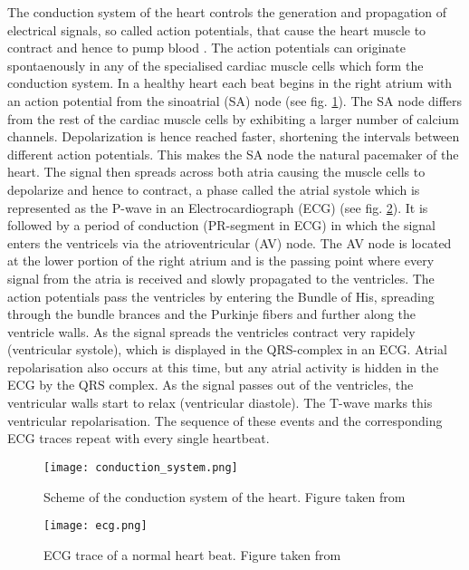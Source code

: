 \documentclass[type=dr, dr=rernat, accentcolor=tud7b,colorbacktitle, bigchapter, openright, twoside, 12pt ]{tudthesis}
\begin{document}
The conduction system of the heart controls the generation and propagation of electrical signals, so called action potentials, that cause 
the heart muscle to contract and hence to pump blood \cite{Med}. The action potentials can originate spontaenously in any of the specialised 
cardiac muscle cells which form the conduction system. In a healthy heart each beat begins in the right atrium with an action potential 
from the sinoatrial (SA) node (see fig. \ref{condsys}). The SA node differs from the rest of the cardiac muscle cells by exhibiting a larger 
number of calcium channels. Depolarization is hence reached faster, shortening the intervals between different action potentials. This makes 
the SA node the natural pacemaker of the heart.
The signal then spreads across both atria causing the muscle cells to depolarize and hence to contract, a phase called the atrial systole 
which is represented as the P-wave in an Electrocardiograph (ECG) (see fig. \ref{ecg}). It is followed by a period of conduction (PR-segment in ECG) in which 
the signal enters the ventricels via the atrioventricular (AV) node. The AV node is located at the lower portion of the right atrium and is 
the passing point where every signal from the atria is received and slowly propagated to the ventricles. The action potentials pass the 
ventricles 
by entering the Bundle of His, spreading through the bundle brances and the Purkinje fibers and further along the ventricle walls. As the 
signal spreads the ventricles contract very rapidely (ventricular systole), which is displayed in the QRS-complex in an ECG. Atrial 
repolarisation also occurs at this time, but any atrial activity is hidden in the ECG by the QRS complex. As the signal passes out of the 
ventricles, the ventricular walls start to relax (ventricular diastole). The T-wave marks this ventricular repolarisation. The sequence of 
these events and the corresponding ECG traces repeat with every single heartbeat.\newline

\vspace{-7cm}
\begin{figure}[H]
\begin{center}
\texttt{[image: conduction\_system.png]}
\caption{Scheme of the conduction system of the heart. Figure taken from \cite{amc}}
\label{condsys}
\end{center}
\end{figure}

\begin{figure}[H]
\begin{center}
\texttt{[image: ecg.png]}
\caption{ECG trace of a normal heart beat. Figure taken from \cite{afib}}
\label{ecg}
\end{center}
\end{figure}
\end{document}
